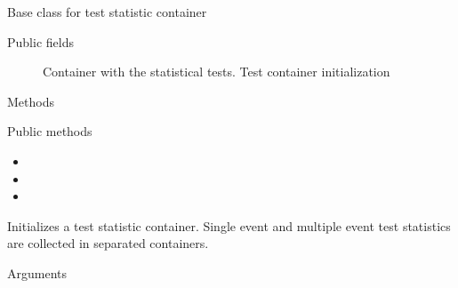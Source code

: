 \documentclass[a4paper]{book}
\begin{document}
%
\begin{Description}
Base class for test statistic container
\end{Description}
%
\begin{Section}{Public fields}

\begin{description}

\item[] Container with the statistical tests.
Test container initialization

\end{description}


\end{Section}
%
\begin{Section}{Methods}
%
\begin{SubSection}{Public methods}
\begin{itemize}

\item{} 
\item{} 
\item{} 

\end{itemize}

\end{SubSection}



\hypertarget{method-StatisticsSetBase-initialize}{}
%
\begin{SubSection}{}
Initializes a test statistic
container. Single event and multiple event
test statistics are collected in separated
containers.
%

%
\begin{SubSubSection}{Arguments}

\begin{description}


\end{description}
\end{SubSubSection}
\end{SubSection}
\end{Section}
\end{document}
